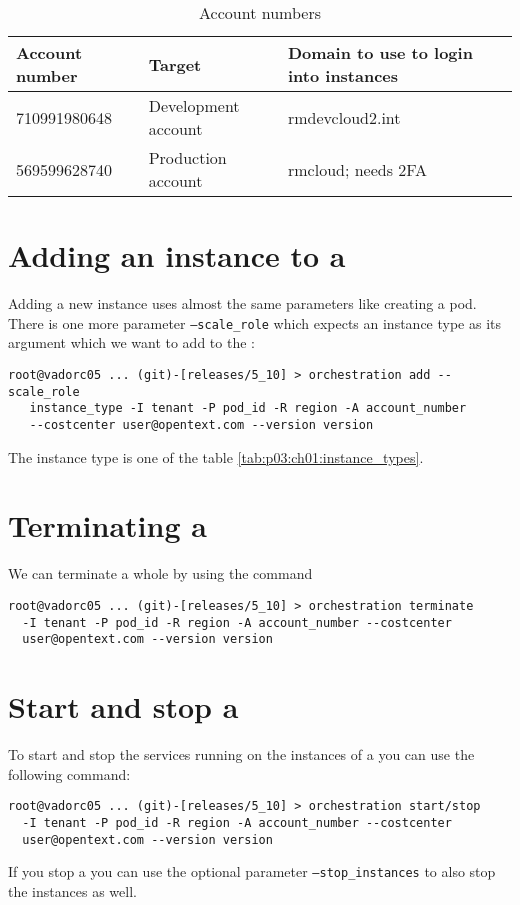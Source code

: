 	\begin{table}[h]
         \center
         \caption{\aws{} Account numbers}
         \begin{tabular}{| l | l | l |}
           \hline
           \textbf{Account number} & \textbf{Target} & \textbf{Domain to use to login into instances} \\ \hline
           710991980648 & Development account  & rmdevcloud2.int \\ \hline
           569599628740 & Production account &  rmcloud; needs 2FA\\ \hline
         \end{tabular}
         \label{tab:p03:ch01:aws_account_nums}
      \end{table}
	
	\section{Adding an instance to a \pod{}}
	Adding a new instance uses almost the same parameters like creating a pod. There is one more parameter \texttt{--scale_role}
	which expects an instance type as its argument which we want to add to the \pod{}:
	\begin{verbatim}
root@vadorc05 ... (git)-[releases/5_10] > orchestration add --scale_role
   instance_type -I tenant -P pod_id -R region -A account_number 
   --costcenter user@opentext.com --version version
	\end{verbatim}
	The instance type is one of the table \ref{tab:p03:ch01:instance_types}.

	\section{Terminating a \pod{}}
	We can terminate a whole \pod{} by using the command
	\begin{verbatim}
root@vadorc05 ... (git)-[releases/5_10] > orchestration terminate 
  -I tenant -P pod_id -R region -A account_number --costcenter 
  user@opentext.com --version version
	\end{verbatim}
	
	\section{Start and stop a \pod{}}
	To start and stop the services running on the instances of a \pod{} you can use the following command:
	\begin{verbatim}
root@vadorc05 ... (git)-[releases/5_10] > orchestration start/stop 
  -I tenant -P pod_id -R region -A account_number --costcenter 
  user@opentext.com --version version
	\end{verbatim}
	If you stop a \pod{} you can use the optional parameter \texttt{--stop_instances} to also stop the instances as well.

